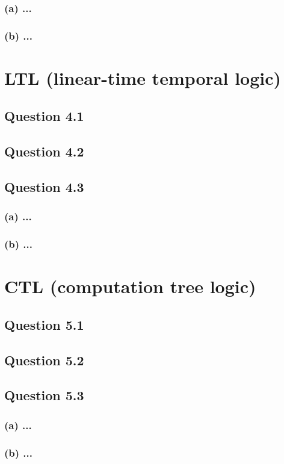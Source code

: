 \documentclass[10pt,a4paper]{article}
\begin{document}
\subsubsection*{(a) \mdseries ...}
\subsubsection*{(b) \mdseries ...}

\section{LTL (linear-time temporal logic)}
\subsection*{Question 4.1}
\subsection*{Question 4.2}
\subsection*{Question 4.3}
\subsubsection*{(a) \mdseries ...}
\subsubsection*{(b) \mdseries ...}

\section{CTL (computation tree logic)}
\subsection*{Question 5.1}
\subsection*{Question 5.2}
\subsection*{Question 5.3}
\subsubsection*{(a) \mdseries ...}
\subsubsection*{(b) \mdseries ...}
\end{document}
